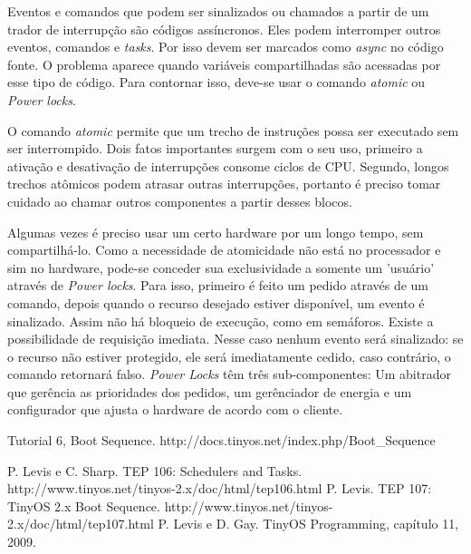 \documentclass[a4paper,onecolumn, 10pt]{article}
\begin{document}
Eventos e comandos que podem ser sinalizados ou chamados a partir de um trador de interrupção são códigos assíncronos. Eles podem interromper outros eventos, comandos e \textit{tasks}. Por isso devem ser marcados como \textit{async} no código fonte. O problema aparece quando variáveis compartilhadas são acessadas por esse tipo de código. Para contornar isso, deve-se usar o comando \textit{atomic} ou \textit{Power locks}.

O comando \textit{atomic} permite que um trecho de instruções possa ser executado sem ser interrompido. Dois fatos importantes surgem com o seu uso, primeiro a ativação e desativação de interrupções consome ciclos de CPU. Segundo, longos trechos atômicos podem atrasar outras interrupções, portanto é preciso tomar cuidado ao chamar outros componentes a partir desses blocos.

Algumas vezes é preciso usar um certo hardware por um longo tempo, sem compartilhá-lo. Como a necessidade de atomicidade não está no processador e sim no hardware, pode-se conceder sua exclusividade a somente um 'usuário' através de \textit{Power locks}. Para isso, primeiro é feito um pedido através de um comando, depois quando o recurso desejado estiver disponível, um evento é sinalizado. Assim não há bloqueio de execução, como em semáforos. Existe a possibilidade de requisição imediata. Nesse caso nenhum evento será sinalizado: se o recurso não estiver protegido, ele será imediatamente cedido, caso contrário, o comando retornará falso. \textit{Power Locks} têm três sub-componentes: Um abitrador que gerência as prioridades dos pedidos, um gerênciador de energia e um configurador que ajusta o hardware de acordo com o cliente.

\pagebreak

\begin{thebibliography}{99}

 Tutorial 6, Boot Sequence. http://docs.tinyos.net/index.php/Boot_Sequence 

 P. Levis e C. Sharp. TEP 106: Schedulers and Tasks. http://www.tinyos.net/tinyos-2.x/doc/html/tep106.html
 P. Levis. TEP 107: TinyOS 2.x Boot Sequence. http://www.tinyos.net/tinyos-2.x/doc/html/tep107.html
 P. Levis e D. Gay. TinyOS Programming, capítulo 11, 2009.
\end{thebibliography}
\end{document}
